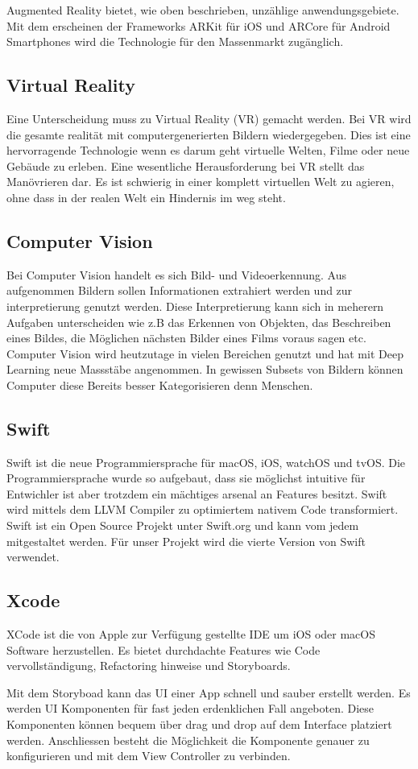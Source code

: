 Augmented Reality bietet, wie oben beschrieben, unzählige anwendungsgebiete. Mit dem erscheinen der Frameworks ARKit für iOS und ARCore für Android Smartphones wird die Technologie für den Massenmarkt zugänglich.

\subsection{Virtual Reality} \label{sub:virtual-reality}
Eine Unterscheidung muss zu Virtual Reality (VR) gemacht werden. Bei VR wird die gesamte realität mit computergenerierten Bildern wiedergegeben. Dies ist eine hervorragende Technologie wenn es darum geht virtuelle Welten, Filme oder neue Gebäude zu erleben. Eine wesentliche Herausforderung bei VR stellt das Manövrieren dar. Es ist schwierig in einer komplett virtuellen Welt zu agieren, ohne dass in der realen Welt ein Hindernis im weg steht.

\subsection{Computer Vision} \label{sub:computer-vision}
Bei Computer Vision handelt es sich Bild- und Videoerkennung. Aus aufgenommen Bildern sollen Informationen extrahiert werden und zur interpretierung genutzt werden. Diese Interpretierung kann sich in meherern Aufgaben unterscheiden wie z.B das Erkennen von Objekten, das Beschreiben eines Bildes, die Möglichen nächsten Bilder eines Films voraus sagen etc. Computer Vision wird heutzutage in vielen Bereichen genutzt und hat mit Deep Learning neue Massstäbe angenommen. In gewissen Subsets von Bildern können Computer diese Bereits besser Kategorisieren denn Menschen.

\subsection{Swift}
Swift ist die neue Programmiersprache für macOS, iOS, watchOS und tvOS. Die Programmiersprache wurde so aufgebaut, dass sie möglichst intuitive für Entwichler ist aber trotzdem ein mächtiges arsenal an Features besitzt. Swift wird mittels dem LLVM Compiler zu optimiertem nativem Code transformiert. Swift ist ein Open Source Projekt unter Swift.org und kann vom jedem mitgestaltet werden. Für unser Projekt wird die vierte Version von Swift verwendet.


\subsection{Xcode}
XCode ist die von Apple zur Verfügung gestellte IDE um iOS oder macOS Software herzustellen. Es bietet durchdachte Features wie Code vervollständigung, Refactoring hinweise und Storyboards.

Mit dem Storyboad kann das UI einer App schnell und sauber erstellt werden. Es werden UI Komponenten für fast jeden erdenklichen Fall angeboten. Diese Komponenten können bequem über drag und drop auf dem Interface platziert werden. Anschliessen besteht die Möglichkeit die Komponente genauer zu konfigurieren und mit dem View Controller zu verbinden.

